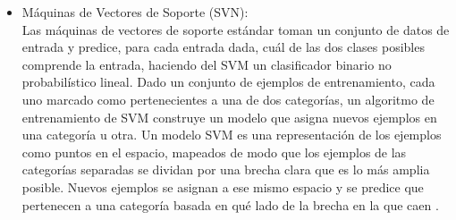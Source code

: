 \begin{itemize}
	\item Máquinas de Vectores de Soporte (SVN):\\

Las máquinas de vectores de soporte estándar toman un conjunto de datos de entrada y predice, para cada entrada dada, cuál de las dos clases posibles comprende la entrada, haciendo del SVM un clasificador binario no probabilístico lineal. Dado un conjunto de ejemplos de entrenamiento, cada uno marcado como pertenecientes a una de dos categorías, un algoritmo de entrenamiento de SVM construye un modelo que asigna nuevos ejemplos en una categoría u otra. Un modelo SVM es una representación de los ejemplos como puntos en el espacio, mapeados de modo que los ejemplos de las categorías separadas se dividan por una brecha clara que es lo más amplia posible. Nuevos ejemplos se asignan a ese mismo espacio y se predice que pertenecen a una categoría basada en qué lado de la brecha en la que caen \cite{svn}.

\end{itemize}  
















